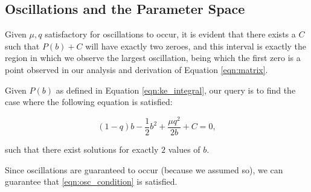 \documentclass{article}
\begin{document}
\subsection[OLD]{Oscillations and the Parameter Space}



Given $\mu, q$ satisfactory for oscillations to occur,
it is evident that there exists a $C$ such that $P(b)+C$ will have exactly two zeroes,
and this interval is exactly the region in which we observe the largest oscillation,
being which the first zero is a point observed in our analysis and derivation of Equation \ref{eqn:matrix}.

Given $P(b)$ as defined in Equation \ref{eqn:ke_integral},
our query is to find the case where the following equation is satisfied:

\begin{equation}
    (1-q)b - \frac{1}{2}b^2 + \frac{\mu q^2}{2b} + C = 0,
\end{equation}

such that there exist solutions for exactly $2$ values of $b$.

Since oscillations are guaranteed to occur (because we assumed so),
we can guarantee that \ref{eqn:osc_condition} is satisfied.











\end{document}
